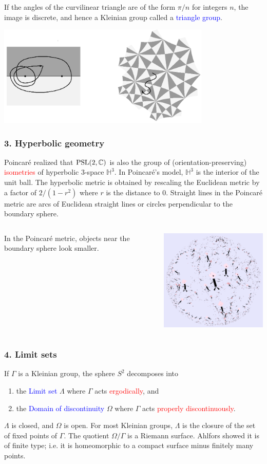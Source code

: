\documentclass{beamer}
\def\H{\mathbb{H}}
\def\C{\mathbb{C}}
\def\PSL{\textnormal{PSL}}
\begin{document}
\frame
{
If the angles of the curvilinear triangle are of the form $\pi/n$ for integers $n$, 
the image is discrete, and hence a Kleinian group
called a \textcolor{blue}{triangle group}.
\begin{center}
\includegraphics[width=4in]{triangle_group.png}
\end{center}
}
\frame
{
\frametitle{3. Hyperbolic geometry}
Poincar\'e realized that $\PSL(2,\C)$ is also the group
of (orientation-preserving) \textcolor{red}{isometries} of hyperbolic 3-space $\H^3$.
\vskip 10pt
In Poincar\'e's model, $\H^3$ is the interior of the unit ball.
The hyperbolic metric is obtained by rescaling the Euclidean metric
by a factor of $2/(1-r^2)$ where $r$ is the distance to $0$.
\vskip 10pt
Straight lines in the Poincar\'e metric are arcs of Euclidean
straight lines or circles perpendicular to the boundary sphere.
}
\frame
{
\begin{columns}[c]
\column{1.1in}
In the Poincar\'e
metric, objects near the
boundary sphere look
smaller.
\column{3in}
\begin{center}
\includegraphics[width=3in]{Poincare.png}
\end{center}
\end{columns}
}
\frame
{
\frametitle{4. Limit sets}
If $\Gamma$ is a Kleinian group, the sphere $S^2$ decomposes into 
\begin{enumerate}
\item{the \textcolor{blue}{Limit set} 
$\Lambda$ where $\Gamma$ acts \textcolor{red}{ergodically}, and}
\item{the \textcolor{blue}{Domain of discontinuity}
$\Omega$ where $\Gamma$ acts \textcolor{red}{properly discontinuously}.}
\end{enumerate}
$\Lambda$ is closed, and $\Omega$ is open. For most Kleinian groups, $\Lambda$ is the closure
of the set of fixed points of $\Gamma$.
\vskip 10pt
The quotient $\Omega/\Gamma$ is a Riemann surface. Ahlfors showed it is of
\textcolor{dgreen}{finite type}; i.e.\/ it is homeomorphic to a compact surface
minus finitely many points.
}
\end{document}
